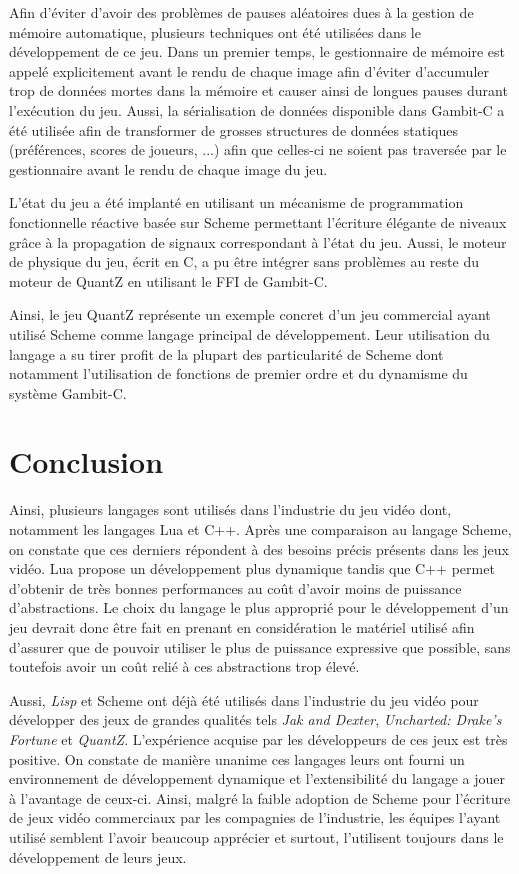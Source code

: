 \documentclass[12pt,oneside,letterpaper,francais]{book}
\newcommand{\lisp}{{\textit{Lisp }}}
\begin{document}
Afin d'éviter d'avoir des problèmes de pauses aléatoires dues à la
gestion de mémoire automatique, plusieurs techniques ont été utilisées
dans le développement de ce jeu. Dans un premier temps, le
gestionnaire de mémoire est appelé explicitement avant le rendu de
chaque image afin d'éviter d'accumuler trop de données mortes dans la
mémoire et causer ainsi de longues pauses durant l'exécution du
jeu. Aussi, la sérialisation de données disponible dans Gambit-C a été
utilisée afin de transformer de grosses structures de données
statiques (préférences, scores de joueurs, ...) afin que celles-ci ne
soient pas traversée par le gestionnaire avant le rendu de chaque
image du jeu.

L'état du jeu a été implanté en utilisant un mécanisme de
programmation fonctionnelle réactive basée sur Scheme permettant
l'écriture élégante de niveaux grâce à la propagation de signaux
correspondant à l'état du jeu. Aussi, le moteur de physique du jeu,
écrit en C, a pu être intégrer sans problèmes au reste du moteur de
QuantZ en utilisant le FFI de Gambit-C.

Ainsi, le jeu QuantZ représente un exemple concret d'un jeu commercial
ayant utilisé Scheme comme langage principal de développement. Leur
utilisation du langage a su tirer profit de la plupart des
particularité de Scheme dont notamment l'utilisation de fonctions de
premier ordre et du dynamisme du système Gambit-C.

\section{Conclusion}
Ainsi, plusieurs langages sont utilisés dans l'industrie du jeu vidéo
dont, notamment les langages Lua et C++. Après une comparaison au
langage Scheme, on constate que ces derniers répondent à des besoins
précis présents dans les jeux vidéo. Lua propose un développement plus
dynamique tandis que C++ permet d'obtenir de très bonnes performances
au coût d'avoir moins de puissance d'abstractions. Le choix du langage
le plus approprié pour le développement d'un jeu devrait donc être
fait en prenant en considération le matériel utilisé afin d'assurer
que de pouvoir utiliser le plus de puissance expressive que possible,
sans toutefois avoir un coût relié à ces abstractions trop élevé.

Aussi, \lisp et Scheme ont déjà été utilisés dans l'industrie du jeu
vidéo pour développer des jeux de grandes qualités tels \textit{Jak
  and Dexter}, \textit{Uncharted: Drake's Fortune} et
\textit{QuantZ}. L'expérience acquise par les développeurs de ces jeux
est très positive. On constate de manière unanime ces langages leurs
ont fourni un environnement de développement dynamique et
l'extensibilité du langage a jouer à l'avantage de ceux-ci. Ainsi,
malgré la faible adoption de Scheme pour l'écriture de jeux vidéo
commerciaux par les compagnies de l'industrie, les équipes l'ayant
utilisé semblent l'avoir beaucoup apprécier et surtout, l'utilisent
toujours dans le développement de leurs jeux.
\end{document}
